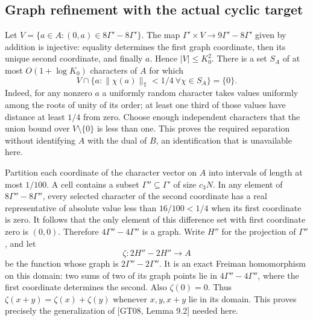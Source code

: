 \documentclass[11pt]{article}
\newcommand{\T}{\mathbb T}
\begin{document}
\subsection*{Graph refinement with the actual cyclic target}
Let $V=\{a\in A:(0,a)\in8\Gamma'-8\Gamma'\}$.
The map $\Gamma'\times V\to9\Gamma'-8\Gamma'$ given by addition is
injective: equality determines the first graph coordinate, then its unique
second coordinate, and finally $a$. Hence $|V|\leq K_0^2$.
There is a set $S_A$ of at most $O(1+\log K_0)$ characters of $A$ for which
\[
        V\cap\{a:\|\chi(a)\|_\T<1/4\ \forall\chi\in S_A\}=\{0\}.
\]
Indeed, for any nonzero $a$ a uniformly random character takes values
uniformly among the roots of unity of its order; at least one third of those
values have distance at least $1/4$ from zero. Choose enough independent
characters that the union bound over $V\setminus\{0\}$ is less than one.
This proves the required separation without identifying $A$ with the dual
of $B$, an identification that is unavailable here.

Partition each coordinate of the character vector on $A$ into intervals of
length at most $1/100$. A cell contains a subset $\Gamma''\subseteq\Gamma'$
of size $c_3N$. In any element of $8\Gamma''-8\Gamma''$, every selected
character of the second coordinate has a real representative of absolute
value less than $16/100<1/4$ when its first coordinate is zero.
It follows that the only element of this difference set with first
coordinate zero is $(0,0)$. Therefore $4\Gamma''-4\Gamma''$ is a graph.
Write $H''$ for the projection of $\Gamma''$, and let
\[
 \zeta:2H''-2H''\longrightarrow A
\]
be the function whose graph is $2\Gamma''-2\Gamma''$.
It is an exact Freiman homomorphism on this domain: two sums of two of its
graph points lie in $4\Gamma''-4\Gamma''$, where the first coordinate
determines the second. Also $\zeta(0)=0$. Thus
$\zeta(x+y)=\zeta(x)+\zeta(y)$ whenever $x,y,x+y$ lie in its domain.
This proves precisely the generalization of [GT08, Lemma 9.2] needed here.
\end{document}
